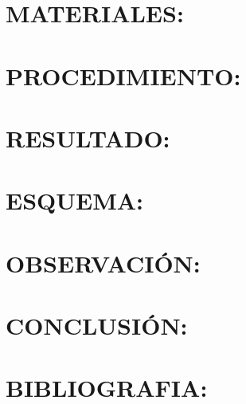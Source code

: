 \documentclass{article}
\begin{document}
		\section{MATERIALES:}\label{sec:MATERIALES}
		
		\section{PROCEDIMIENTO:}\label{sec:PROCEDIMIENTO}
		
		\section{RESULTADO:}\label{sec:RESULTADO}
		
		\section{ESQUEMA:}\label{sec:ESQUEMA}
		
		\section{OBSERVACIÓN:}\label{sec:OBSERVACIÓN}
		
		\section{CONCLUSIÓN:}\label{sec:CONCLUSIÓN}
		
		\section{BIBLIOGRAFIA:}\label{sec:BIBLIOGRAFIA}
		
	
\end{document}
